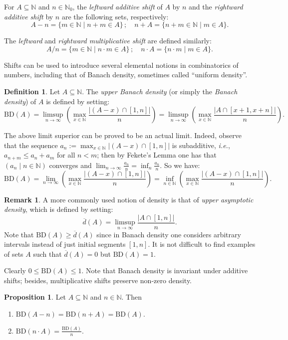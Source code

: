 \documentclass[a4paper,oneside]{article}
\newcommand{\N}{\mathbb{N}}
\theoremstyle{definition}
\newtheorem{remark}[theorem]{Remark}
\newtheorem{proposition}[theorem]{Proposition}
\newtheorem{definition}[theorem]{Definition}
\theoremstyle{named}
\begin{document}
For $A\subseteq\N$ and $n\in\N_0$, 
the \emph{leftward additive shift} of $A$ by $n$
and the \emph{rightward additive shift} by $n$ are the following sets, respectively:
$$A-n=\{m\in\N\mid n+m\in A\}\,;\quad
n+A=\{n+m\in\N\mid m\in A\}.$$

The \emph{leftward} and \emph{rightward multiplicative shift} are defined similarly:
$$A/n=\{m\in\N\mid n\cdot m\in A\}\,;\quad
n\cdot A=\{n\cdot m\mid m\in A\}.$$

Shifts can be used to introduce several
elemental notions in combinatorics of numbers, including that of Banach density, sometimes called ``uniform density''.

\begin{definition}
{\rm Let $A\subseteq\N$. The \emph{upper Banach density} (or simply the \emph{Banach density}) of $A$ 
is defined by setting:
$$\text{BD}(A)=\limsup_{n\to\infty}\left(\max_{x\in\N}\frac{|(A-x)\cap[1,n]|}{n}\right)=
\limsup_{n\to\infty}\left(\max_{x\in\N}\frac{|A\cap[x+1,x+n]|}{n}\right).$$}
\end{definition}

The above limit superior can be proved to be an actual limit. 
Indeed, observe that the sequence $a_n:=\max_{x\in\N}|(A-x)\cap[1,n]|$ 
is subadditive, \emph{i.e.}, $a_{n+m}\le a_n+a_m$ for all $n<m$; 
then by Fekete's Lemma one has that $(a_n\mid n\in\N)$ converges and
$\lim_{n\to\infty}\frac{a_n}{n}=\inf_{n}\frac{a_n}{n}$.
So we have:
$$\text{BD}(A)=\lim_{n\to\infty}\left(\max_{x\in\N}\frac{|(A-x)\cap[1,n]|}{n}\right)=
\inf_{n\in\N}\left(\max_{x\in\N}\frac{|(A-x)\cap[1,n]|}{n}\right).$$


\begin{remark}
{\rm A more commonly used notion of density is that of \emph{upper asymptotic density},
which is defined by setting:
$$\overline{d}(A)=\limsup_{n\to\infty}\frac{|A\cap[1,n]|}{n}.$$
Note that $\text{BD}(A)\ge\overline{d}(A)$ since in Banach density one
considers arbitrary intervals instead of just initial segments $[1,n]$.
It is not difficult to find examples of sets $A$ such that $\overline{d}(A)=0$ but $\text{BD}(A)=1$.}
\end{remark}

Clearly $0\le\text{BD}(A)\le 1$. Note that Banach density is invariant under additive shifts;
besides, multiplicative shifts preserve non-zero density.

\begin{proposition}
Let $A\subseteq\N$ and $n\in\N$. Then

\begin{enumerate}
\item
$\text{BD}(A-n)=\text{BD}(n+A)=\text{BD}(A)$.
\item
$\text{BD}(n\cdot A)=\frac{\text{BD}(A)}{n}$.
\end{enumerate}
\end{proposition}
\end{document}
